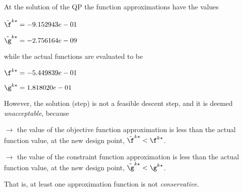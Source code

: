 At the solution of the QP the function approximations have the values

$\tilde \f^{k\star} = -9.152943e-01$

$\tilde \g^{k\star} = -2.756164e-09$

\bigskip
while the actual functions are evaluated to be

$\f^{k\star} = -5.449839e-01$

$\g^{k\star} =  1.818020e-01$

\bigskip
 However, the solution (step)                         is not a feasible descent step, and it is deemed                         \emph{unacceptable}, because 
 
$\to$ the value of the objective                             function approximation is less than the actual function                             value, at the new design point,                             $\tilde {\f}^{k\star} < {\f}^{k\star}$.

 $\to$ the value of the constraint function                             approximation is less than the actual function value, at                             the new design point, $\tilde {\g}^{k\star} < {\g}^{k\star}$.

 \bigskip 

 That is, at least one approximation                         function is not \emph{conservative}.
